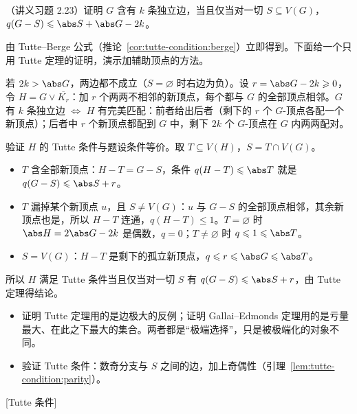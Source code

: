 \begin{workedexample}\label{we:tutte-condition:k-edges}
（讲义习题 2.23）证明 $G$ 含有 $k$ 条独立边，当且仅当对一切 $S\subseteq V(G)$，$q(G-S)\leqslant\abs S+\abs G-2k$。
\end{workedexample}
\begin{solution}
由 Tutte--Berge 公式（推论~\ref{cor:tutte-condition:berge}）立即得到。下面给一个只用 Tutte 定理的证明，演示加辅助顶点的方法。

若 $2k>\abs G$，两边都不成立（$S=\varnothing$ 时右边为负）。设 $r=\abs G-2k\geqslant0$，令 $H=G\vee\overline{K_r}$：加 $r$ 个两两不相邻的新顶点，每个都与 $G$ 的全部顶点相邻。$G$ 有 $k$ 条独立边 $\iff$ $H$ 有完美匹配：前者给出后者（剩下的 $r$ 个 $G$-顶点各配一个新顶点）；后者中 $r$ 个新顶点都配到 $G$ 中，剩下 $2k$ 个 $G$-顶点在 $G$ 内两两配对。

验证 $H$ 的 Tutte 条件与题设条件等价。取 $T\subseteq V(H)$，$S=T\cap V(G)$。
\begin{itemize}
\item $T$ 含全部新顶点：$H-T=G-S$，条件 $q(H-T)\leqslant\abs T$ 就是 $q(G-S)\leqslant\abs S+r$。
\item $T$ 漏掉某个新顶点 $u$，且 $S\neq V(G)$：$u$ 与 $G-S$ 的全部顶点相邻，其余新顶点也是，所以 $H-T$ 连通，$q(H-T)\leqslant1$。$T=\varnothing$ 时 $\abs H=2\abs G-2k$ 是偶数，$q=0$；$T\neq\varnothing$ 时 $q\leqslant1\leqslant\abs T$。
\item $S=V(G)$：$H-T$ 是剩下的孤立新顶点，$q\leqslant r\leqslant\abs G\leqslant\abs T$。
\end{itemize}
所以 $H$ 满足 Tutte 条件当且仅当对一切 $S$ 有 $q(G-S)\leqslant\abs S+r$，由 Tutte 定理得结论。
\end{solution}


\begin{itemize}
\item 证明 Tutte 定理用的是边极大的反例；证明 Gallai--Edmonds 定理用的是亏量最大、在此之下最大的集合。两者都是“极端选择”，只是被极端化的对象不同。
\item 验证 Tutte 条件：数奇分支与 $S$ 之间的边，加上奇偶性（引理~\ref{lem:tutte-condition:parity}）。
\end{itemize}

[Tutte 条件]


